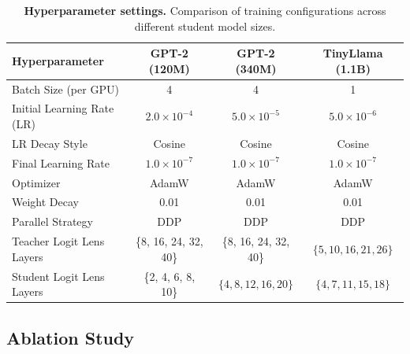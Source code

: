 \documentclass{article}
\theoremstyle{plain}
\theoremstyle{definition}
\theoremstyle{remark}
\begin{document}
\begin{table}[h]
    \centering
    \small
    \renewcommand{\arraystretch}{1.2}
    \caption{\textbf{Hyperparameter settings.} Comparison of training configurations across different student model sizes.}
    \begin{tabular}{l|c|c|c}
    \toprule
    \textbf{Hyperparameter} & \textbf{GPT-2 (120M)} & \textbf{GPT-2 (340M)} & \textbf{TinyLlama (1.1B)} \\
    \midrule
    Batch Size (per GPU) & 4 & 4 & 1 \\
    Initial Learning Rate (LR) & $2.0 \times 10^{-4}$ & $5.0 \times 10^{-5}$ & $5.0 \times 10^{-6}$ \\
    LR Decay Style & Cosine & Cosine & Cosine \\
    Final Learning Rate & $1.0 \times 10^{-7}$ & $1.0 \times 10^{-7}$& $1.0 \times 10^{-7}$ \\
    Optimizer & AdamW & AdamW & AdamW \\
    Weight Decay & 0.01 & 0.01 & 0.01 \\
    Parallel Strategy & DDP & DDP & DDP \\
    Teacher Logit Lens Layers & \{8, 16, 24, 32, 40\} & \{8, 16, 24, 32, 40\} & $\{5, 10, 16, 21, 26\}$ \\
    Student Logit Lens Layers & \{2, 4, 6, 8, 10\} & $\{4, 8, 12, 16, 20\}$ & $\{4, 7, 11, 15, 18\}$ \\
    \bottomrule
    \end{tabular}
    \label{app:tab:hyperparameters}
\end{table}

\subsection{Ablation Study}
\label{app:sec:ablation_study}
\end{document}
